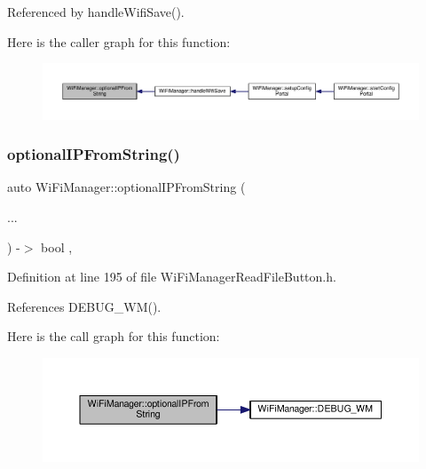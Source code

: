 Referenced by handle\+Wifi\+Save().

Here is the caller graph for this function\+:\nopagebreak
\begin{figure}[H]
\begin{center}
\leavevmode
\includegraphics[width=350pt]{d4/dc8/class_wi_fi_manager_a6a94f08eb43e0871932556a4ccfa11b7_icgraph}
\end{center}
\end{figure}
\mbox{\label{class_wi_fi_manager_aa248b818eee0423b14a88c637f7c4637}} 
\subsubsection{\texorpdfstring{optional\+I\+P\+From\+String()}{optionalIPFromString()}\hspace{0.1cm}{\footnotesize\ttfamily [2/2]}}
{\footnotesize\ttfamily auto Wi\+Fi\+Manager\+::optional\+I\+P\+From\+String (\begin{DoxyParamCaption}\item[{}]{... }\end{DoxyParamCaption}) -\/$>$ bool \hspace{0.3cm}{\ttfamily [inline]}, {\ttfamily [private]}}



Definition at line 195 of file Wi\+Fi\+Manager\+Read\+File\+Button.\+h.



References D\+E\+B\+U\+G\+\_\+\+W\+M().

Here is the call graph for this function\+:\nopagebreak
\begin{figure}[H]
\begin{center}
\leavevmode
\includegraphics[width=350pt]{d4/dc8/class_wi_fi_manager_aa248b818eee0423b14a88c637f7c4637_cgraph}
\end{center}
\end{figure}


